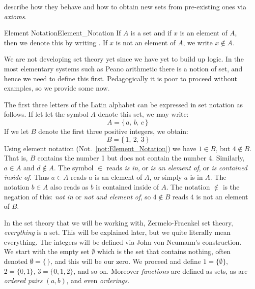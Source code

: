         describe how they behave and how to obtain new sets from pre-existing
        ones via \textit{axioms}.
        \begin{fnotation}{Element Notation}{Element_Notation}
            If $A$ is a \gls{set} and if $x$ is an element
            of $A$, then we denote this by writing
            . If $x$ is not an element
            of $A$, we write $x\notin{A}$.%
        \end{fnotation}
        We are not developing set theory yet since we have yet to build up
        logic. In the most elementary systems such as Peano arithmetic there is
        a notion of set, and hence we need to define this first. Pedagogically
        it is poor to proceed without examples, so we provide some now.
        \begin{example}
            The first three letters of the Latin alphabet can be expressed in
            set notation as follows. If let let the symbol $A$ denote this set,
            we may write:
            \begin{equation}
                A=\{\,a,\,b,\,c\,\}
            \end{equation}
            If we let $B$ denote the first three positive integers, we obtain:
            \begin{equation}
                B=\{\,1,\,2,\,3\,\}
            \end{equation}
            Using element notation (Not.~\ref{not:Element_Notation}) we have
            $1\in{B}$, but $4\notin{B}$. That is, $B$ contains the number 1 but
            does not contain the number 4. Similarly, $a\in{A}$ and
            $d\notin{A}$. The symbol $\in$ reads \textit{is in}, or
            \textit{is an element of}, or \textit{is contained inside of}. Thus
            $a\in{A}$ reads $a$ is an element of $A$, or simply $a$ is in $A$.
            The notation $b\in{A}$ also reads as $b$ is contained inside of $A$.
            The notation $\notin$ is the negation of this: \textit{not in} or
            \textit{not and element of}, so $4\notin{B}$ reads 4 is not an
            element of $B$.
        \end{example}
        \begin{example}
            \label{ex:Everything_is_a_Set}%
            In the set theory that we will be working with, Zermelo-Fraenkel set
            theory, \textit{everything} is a
            set. This will be explained later, but we quite literally mean
            everything. The integers will be defined via John von
            Neumann's construction. We start with the
            empty set $\emptyset$ which is the set that
            contains nothing, often denoted $\emptyset=\{\,\}$, and this will be
            our zero. We proceed and define $1=\{\emptyset\}$, $2=\{0,1\}$,
            $3=\{0,1,2\}$, and so on. Moreover \textit{functions} are defined as
            sets, as are \textit{ordered pairs} $(a,b)$, and even
            \textit{orderings}.
        \end{example}
